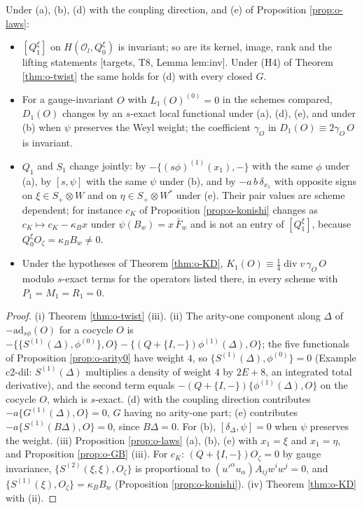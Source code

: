 \begin{theorem}
\label{thm:o-invariants}
Under (a), (b), (d) with the coupling direction, and (e) of Proposition \ref{prop:o-laws}:
\begin{itemize}
\item[(i)] $[Q_1^\xi]$ on $H(\mathscr O_l,Q_0^\xi)$ is invariant; so are its kernel, image, rank and the lifting statements [targets, T8, Lemma lem:inv]. Under (H4) of Theorem \ref{thm:o-twist} the same holds for (d) with every closed $G$.
\item[(ii)] For a gauge-invariant $O$ with $L_1(O)^{(0)}=0$ in the schemes compared, $D_1(O)$ changes by an $s$-exact local functional under (a), (d), (e), and under (b) when $\psi$ preserves the Weyl weight; the coefficient $\gamma_O$ in $D_1(O)\equiv2\gamma_O\,O$ is invariant.
\item[(iii)] $Q_1$ and $S_1$ change jointly: by $-\{(s\phi)^{(1)}(x_1),-\}$ with the same $\phi$ under (a), by $[s,\psi]$ with the same $\psi$ under (b), and by $-a\,b\,\delta_{x_1}$ with opposite signs on $\xi\in S_+\otimes W$ and on $\eta\in S_+\otimes W^*$ under (e). Their pair values are scheme dependent; for instance $c_K$ of Proposition \ref{prop:o-konishi} changes as $c_K\mapsto c_K-\kappa_Bx$ under $\psi(B_w)=x\,\bar F_w$ and is not an entry of $[Q_1^\xi]$, because $Q_0^\xi O_\zeta=\kappa_BB_w\neq0$.
\item[(iv)] Under the hypotheses of Theorem \ref{thm:o-KD}, $K_1(O)\equiv\tfrac14\operatorname{div}v\,\gamma_O\,O$ modulo $s$-exact terms for the operators listed there, in every scheme with $P_1=M_1=R_1=0$.
\end{itemize}
\end{theorem}

\begin{proof}
(i) Theorem \ref{thm:o-twist} (iii). (ii) The arity-one component along $\Delta$ of $-\mathrm{ad}_{s\phi}(O)$ for a cocycle $O$ is $-\{\{S^{(1)}(\Delta),\phi^{(0)}\},O\}-\{(Q+\{I,-\})\phi^{(1)}(\Delta),O\}$; the five functionals of Proposition \ref{prop:o-arity0} have weight $4$, so $\{S^{(1)}(\Delta),\phi^{(0)}\}=0$ (Example c2-dil: $S^{(1)}(\Delta)$ multiplies a density of weight $4$ by $2E+8$, an integrated total derivative), and the second term equals $-(Q+\{I,-\})\{\phi^{(1)}(\Delta),O\}$ on the cocycle $O$, which is $s$-exact. (d) with the coupling direction contributes $-a\{G^{(1)}(\Delta),O\}=0$, $G$ having no arity-one part; (e) contributes $-a\{S^{(1)}(B\Delta),O\}=0$, since $B\Delta=0$. For (b), $[\delta_\Delta,\psi]=0$ when $\psi$ preserves the weight. (iii) Proposition \ref{prop:o-laws} (a), (b), (e) with $x_1=\xi$ and $x_1=\eta$, and Proposition \ref{prop:o-GB} (iii). For $c_K$: $(Q+\{I,-\})O_\zeta=0$ by gauge invariance, $\{S^{(2)}(\xi,\xi),O_\zeta\}$ is proportional to $(u'^\alpha u_\alpha)A_{ij}w^iw^j=0$, and $\{S^{(1)}(\xi),O_\zeta\}=\kappa_BB_w$ (Proposition \ref{prop:o-konishi}). (iv) Theorem \ref{thm:o-KD} with (ii).
\end{proof}

